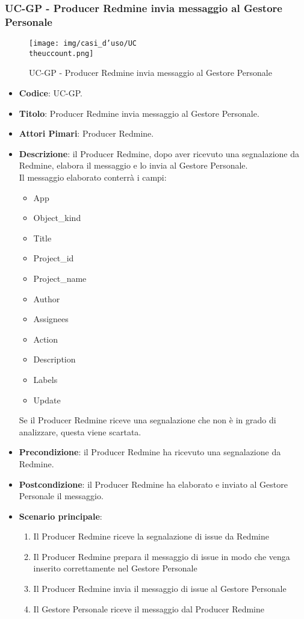 \subsubsection{UC\theuccount-GP - Producer Redmine invia messaggio al Gestore Personale}
    \begin{figure}[H]
		\centering
		\texttt{[image: img/casi\_d'uso/UC\\theuccount.png]}\\
		\caption{UC\theuccount-GP - Producer Redmine invia messaggio al Gestore Personale}
	\end{figure}
	\begin{itemize}
		\item \textbf{Codice}: UC\theuccount-GP.
		\item \textbf{Titolo}: Producer Redmine invia messaggio al Gestore Personale.
		\item \textbf{Attori Pimari}: Producer Redmine.
		\item \textbf{Descrizione}: il Producer Redmine, dopo aver ricevuto una
		 segnalazione da Redmine, elabora il messaggio e lo invia al Gestore Personale.\\
		 Il messaggio elaborato conterrà i campi:
		 \begin{itemize}
		 	\item App
		 	\item Object\_kind
		 	\item Title
		 	\item Project\_id
		 	\item Project\_name
		 	\item Author
		 	\item Assignees
		 	\item Action
		 	\item Description
		 	\item Labels
		 	\item Update
		 \end{itemize}
        Se il Producer Redmine riceve una segnalazione che non è in grado di analizzare, questa viene scartata.
		\item \textbf{Precondizione}: il Producer Redmine ha ricevuto una segnalazione da Redmine.
		\item \textbf{Postcondizione}: il Producer Redmine ha elaborato e inviato al Gestore Personale il messaggio.
		\item \textbf{Scenario principale}:
		\begin{enumerate}
			\item Il Producer Redmine riceve la segnalazione di issue da Redmine
			\item Il Producer Redmine prepara il messaggio di issue in modo che venga inserito correttamente nel Gestore Personale
			\item Il Producer Redmine invia il messaggio di issue al Gestore Personale
            \item Il Gestore Personale riceve il messaggio dal Producer Redmine
		\end{enumerate}
	\end{itemize}

